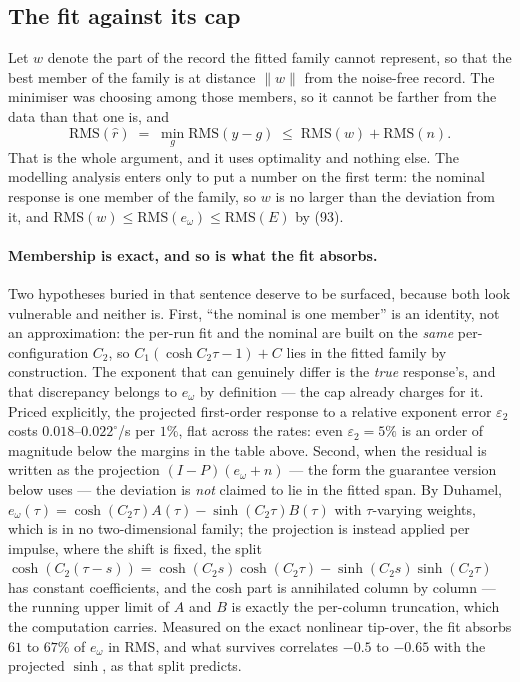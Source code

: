 \documentclass[10pt]{article}
\begin{document}
\subsection{The fit against its cap}

Let $w$ denote the part of the record the fitted family cannot
represent, so that the best member of the family is at distance $\|w\|$
from the noise-free record. The minimiser was choosing among those
members, so it cannot be farther from the data than that one is, and
\begin{equation}
  \mathrm{RMS}(\hat r) \;=\; \min_g\mathrm{RMS}(y-g)
  \;\le\; \mathrm{RMS}(w) + \mathrm{RMS}(n) .
  \tag{VIII.3}
\end{equation}
That is the whole argument, and it uses optimality and nothing else.
The modelling analysis enters only to put a number on the first term:
the nominal response is one member of the family, so $w$ is no larger
than the deviation from it, and $\mathrm{RMS}(w) \le
\mathrm{RMS}(e_\omega) \le \mathrm{RMS}(E)$ by (93).

\paragraph{Membership is exact, and so is what the fit absorbs.} Two
hypotheses buried in that sentence deserve to be surfaced, because both
look vulnerable and neither is. First, ``the nominal is one member''
is an identity, not an approximation: the per-run fit and the nominal
are built on the \emph{same} per-configuration $C_2$, so
$C_1(\cosh C_2\tau-1)+C$ lies in the fitted family by construction.
The exponent that can genuinely differ is the \emph{true} response's,
and that discrepancy belongs to $e_\omega$ by definition --- the cap
already charges for it. Priced explicitly, the projected first-order
response to a relative exponent error $\varepsilon_2$ costs
$0.018$--$0.022^\circ$/s per $1\%$, flat across the rates: even
$\varepsilon_2=5\%$ is an order of magnitude below the margins in the
table above. Second, when the residual is written as the projection
$(I-P)(e_\omega+n)$ --- the form the guarantee version below uses ---
the deviation is \emph{not} claimed to lie in the fitted span. By
Duhamel, $e_\omega(\tau) = \cosh(C_2\tau)A(\tau) -
\sinh(C_2\tau)B(\tau)$ with $\tau$-varying weights, which is in no
two-dimensional family; the projection is instead applied per impulse,
where the shift is fixed, the split $\cosh(C_2(\tau-s)) =
\cosh(C_2 s)\cosh(C_2\tau) - \sinh(C_2 s)\sinh(C_2\tau)$ has constant
coefficients, and the cosh part is annihilated column by column ---
the running upper limit of $A$ and $B$ is exactly the per-column
truncation, which the computation carries. Measured on the exact
nonlinear tip-over, the fit absorbs $61$ to $67\%$ of $e_\omega$ in
RMS, and what survives correlates $-0.5$ to $-0.65$ with the projected
$\sinh$, as that split predicts.
\end{document}
